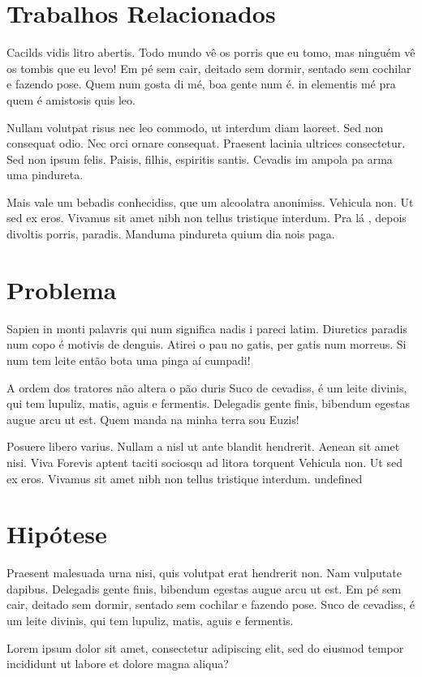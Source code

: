 \section{Trabalhos Relacionados} \label{sec:trabRelac}
Cacilds vidis litro abertis. Todo mundo vê os porris que eu tomo, mas ninguém vê os tombis que eu levo! Em pé sem cair, deitado sem dormir, sentado sem cochilar e fazendo pose. Quem num gosta di mé, boa gente num é. in elementis mé pra quem é amistosis quis leo.

Nullam volutpat risus nec leo commodo, ut interdum diam laoreet. Sed non consequat odio. Nec orci ornare consequat. Praesent lacinia ultrices consectetur. Sed non ipsum felis. Paisis, filhis, espiritis santis. Cevadis im ampola pa arma uma pindureta.

Mais vale um bebadis conhecidiss, que um alcoolatra anonimiss. Vehicula non. Ut sed ex eros. Vivamus sit amet nibh non tellus tristique interdum. Pra lá , depois divoltis porris, paradis. Manduma pindureta quium dia nois paga.

\section{Problema} \label{sec:problema}
Sapien in monti palavris qui num significa nadis i pareci latim. Diuretics paradis num copo é motivis de denguis. Atirei o pau no gatis, per gatis num morreus. Si num tem leite então bota uma pinga aí cumpadi!

A ordem dos tratores não altera o pão duris Suco de cevadiss, é um leite divinis, qui tem lupuliz, matis, aguis e fermentis. Delegadis gente finis, bibendum egestas augue arcu ut est. Quem manda na minha terra sou Euzis!

Posuere libero varius. Nullam a nisl ut ante blandit hendrerit. Aenean sit amet nisi. Viva Forevis aptent taciti sociosqu ad litora torquent Vehicula non. Ut sed ex eros. Vivamus sit amet nibh non tellus tristique interdum. undefined 

\section{Hipótese} \label{sec:hipotese}
Praesent malesuada urna nisi, quis volutpat erat hendrerit non. Nam vulputate dapibus. Delegadis gente finis, bibendum egestas augue arcu ut est. Em pé sem cair, deitado sem dormir, sentado sem cochilar e fazendo pose. Suco de cevadiss, é um leite divinis, qui tem lupuliz, matis, aguis e fermentis.
\begin{hipo}
Lorem ipsum dolor sit amet, consectetur adipiscing elit, sed do eiusmod tempor incididunt ut labore et dolore magna aliqua?
\end{hipo}




